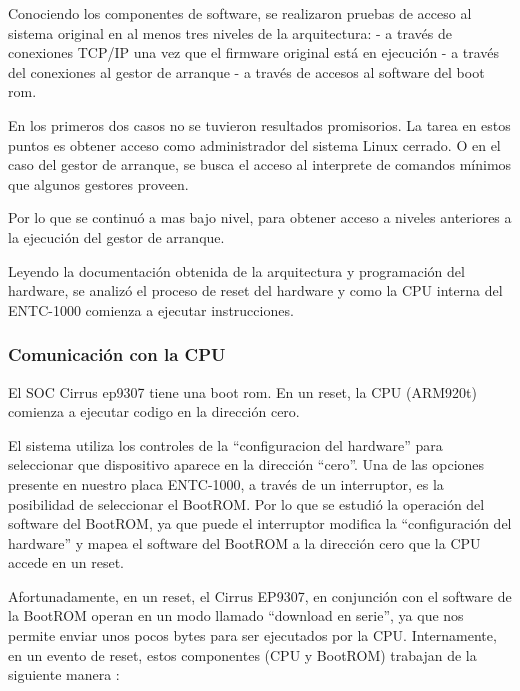 \documentclass[conference]{IEEEtran}
\begin{document}
Conociendo los componentes de software, se realizaron pruebas
de acceso al sistema original en al menos tres niveles de la arquitectura:
- a través de conexiones TCP/IP una vez que el firmware original está en ejecución
- a través del conexiones al gestor de arranque
- a través de accesos al software del boot rom.

En los primeros dos casos no se tuvieron resultados promisorios.
La tarea en estos puntos es obtener acceso como administrador del sistema
Linux cerrado. O en el caso del gestor de arranque, se busca
el acceso al interprete de comandos mínimos que algunos gestores proveen.

Por lo que se continuó a mas bajo nivel, para obtener acceso a niveles
anteriores a la ejecución del gestor de arranque.

Leyendo la documentación obtenida de la arquitectura y programación del hardware,
se analizó el proceso de reset del hardware y como la CPU interna
del ENTC-1000 comienza a ejecutar instrucciones.

\subsubsection{Comunicación con la CPU}

El SOC Cirrus ep9307 tiene una boot rom.
En un reset, la CPU (ARM920t) comienza a ejecutar codigo en la dirección cero.

El sistema utiliza los controles de la ``configuracion del hardware'' para seleccionar
que dispositivo aparece en la dirección ``cero''.
Una de las opciones presente en nuestro placa ENTC-1000, a través de un interruptor,
es la posibilidad de seleccionar el BootROM. Por lo que se estudió
la operación del software del BootROM, ya que puede el interruptor
modifica la ``configuración del hardware'' y mapea el software del BootROM
a la dirección cero que la CPU accede en un reset.

Afortunadamente, en un reset, el Cirrus EP9307, en conjunción
con el software de la BootROM operan en un modo llamado 
``download en serie'', ya que nos permite enviar unos pocos
bytes para ser ejecutados por la CPU. Internamente, en un evento de reset,
estos componentes (CPU y BootROM) trabajan de la siguiente manera :
\end{document}
